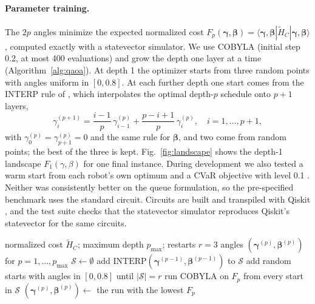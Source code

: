 \documentclass[a4paper,fleqn]{cas-dc}
\begin{document}
\paragraph{Parameter training.} The $2p$ angles minimize the expected normalized cost $F_p(\boldsymbol\gamma,\boldsymbol\beta) = \langle\boldsymbol\gamma,\boldsymbol\beta|\tilde H_C|\boldsymbol\gamma,\boldsymbol\beta\rangle$, computed exactly with a statevector simulator. We use COBYLA \citep{powell1994cobyla} (initial step 0.2, at most 400 evaluations) and grow the depth one layer at a time (Algorithm~\ref{alg:qaoa}). At depth 1 the optimizer starts from three random points with angles uniform in $[0, 0.8]$. At each further depth one start comes from the INTERP rule of \citet{zhou2020qaoa}, which interpolates the optimal depth-$p$ schedule onto $p+1$ layers,
\begin{equation}
\gamma_i^{(p+1)} = \frac{i-1}{p}\,\gamma_{i-1}^{(p)} + \frac{p-i+1}{p}\,\gamma_{i}^{(p)}, \quad i = 1,\dots,p+1,
\label{eq:interp}
\end{equation}
with $\gamma_0^{(p)} = \gamma_{p+1}^{(p)} = 0$ and the same rule for $\boldsymbol\beta$, and two come from random points; the best of the three is kept. Fig.~\ref{fig:landscape} shows the depth-1 landscape $F_1(\gamma,\beta)$ for one final instance. During development we also tested a warm start from each robot's own optimum \citep{egger2021warm} and a CVaR objective with level 0.1 \citep{barkoutsos2020cvar}. Neither was consistently better on the queue formulation, so the pre-specified benchmark uses the standard circuit. Circuits are built and transpiled with Qiskit \citep{javadi2024qiskit}, and the test suite checks that the statevector simulator reproduces Qiskit's statevector for the same circuits.

\begin{algorithm}
\caption{QAOA training with INTERP depth growth}
\label{alg:qaoa}
\begin{algorithmic}[1]
\Require normalized cost $\tilde H_C$; maximum depth $p_{\max}$; restarts $r = 3$
\Ensure angles $(\boldsymbol\gamma^{(p)},\boldsymbol\beta^{(p)})$ for $p = 1,\dots,p_{\max}$
  \State $\mathcal{S} \gets \emptyset$
   \State add $\mathrm{INTERP}(\boldsymbol\gamma^{(p-1)},\boldsymbol\beta^{(p-1)})$ to $\mathcal{S}$  \EndIf
  \State add random starts with angles in $[0, 0.8]$ until $|\mathcal{S}| = r$
  \State run COBYLA on $F_p$ from every start in $\mathcal{S}$
  \State $(\boldsymbol\gamma^{(p)},\boldsymbol\beta^{(p)}) \gets$ the run with the lowest $F_p$
\EndFor
\end{algorithmic}
\end{algorithm}
\end{document}
